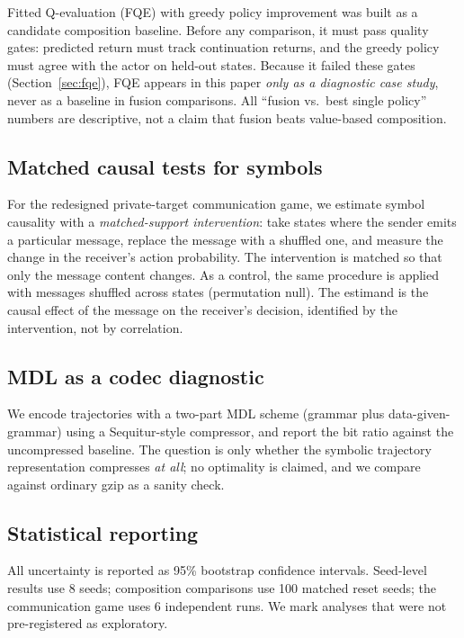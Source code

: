 \documentclass[11pt]{article}
\begin{document}
Fitted Q-evaluation (FQE) \cite{le2019} with greedy policy improvement was built as a candidate composition baseline. Before any comparison, it must pass quality gates: predicted return must track continuation returns, and the greedy policy must agree with the actor on held-out states. Because it failed these gates (Section~\ref{sec:fqe}), FQE appears in this paper \textit{only as a diagnostic case study}, never as a baseline in fusion comparisons. All ``fusion vs.\ best single policy'' numbers are descriptive, not a claim that fusion beats value-based composition.

\subsection{Matched causal tests for symbols}
\label{sec:symbols}

For the redesigned private-target communication game, we estimate symbol causality with a \textit{matched-support intervention}: take states where the sender emits a particular message, replace the message with a shuffled one, and measure the change in the receiver's action probability. The intervention is matched so that only the message content changes. As a control, the same procedure is applied with messages shuffled across states (permutation null). The estimand is the causal effect of the message on the receiver's decision, identified by the intervention, not by correlation.

\subsection{MDL as a codec diagnostic}

We encode trajectories with a two-part MDL scheme (grammar plus data-given-grammar) using a Sequitur-style \cite{nevill-manning1997} compressor, and report the bit ratio against the uncompressed baseline. The question is only whether the symbolic trajectory representation compresses \textit{at all}; no optimality is claimed, and we compare against ordinary gzip as a sanity check.

\subsection{Statistical reporting}

All uncertainty is reported as 95\% bootstrap confidence intervals. Seed-level results use 8 seeds; composition comparisons use 100 matched reset seeds; the communication game uses 6 independent runs. We mark analyses that were not pre-registered as exploratory.
\end{document}
